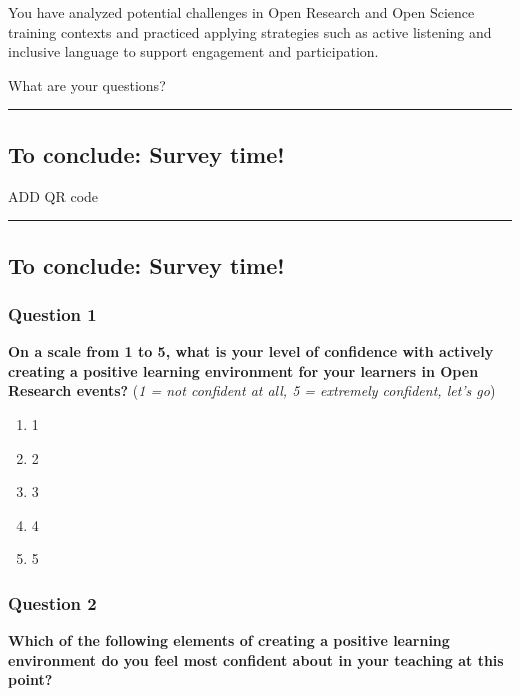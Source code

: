 \documentclass[
  letterpaper,
  DIV=11,
  numbers=noendperiod]{scrartcl}
\begin{document}
You have analyzed potential challenges in Open Research and Open Science
training contexts and practiced applying strategies such as active
listening and inclusive language to support engagement and
participation.

What are your questions?

\begin{center}\rule{0.5\linewidth}{0.5pt}\end{center}

\subsection{To conclude: Survey time!}\label{to-conclude-survey-time}

ADD QR code

\begin{center}\rule{0.5\linewidth}{0.5pt}\end{center}

\subsection{To conclude: Survey time!}\label{to-conclude-survey-time-1}

\subsubsection{Question 1}

\textbf{On a scale from 1 to 5, what is your level of confidence with
actively creating a positive learning environment for your learners in
Open Research events?} (\emph{1 = not confident at all, 5 = extremely
confident, let's go})

\begin{enumerate}
\def\labelenumi{\alph{enumi}.}
\item
  1
\item
  2
\item
  3
\item
  4
\item
  5
\end{enumerate}

\subsubsection{Question 2}

\textbf{Which of the following elements of creating a positive learning
environment do you feel most confident about in your teaching at this
point?}
\end{document}
